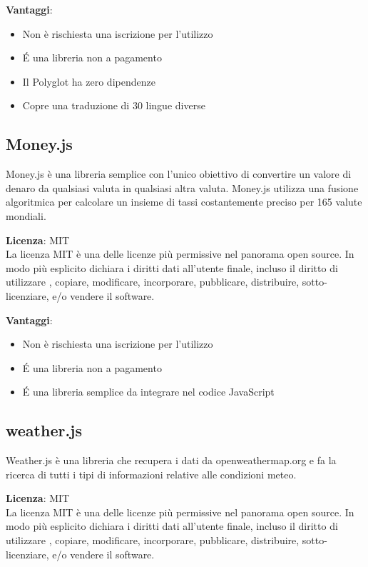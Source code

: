 \textbf{Vantaggi}: 
\begin{itemize}
	\item Non è rischiesta una iscrizione per l'utilizzo
	\item \'E una libreria non a pagamento
	\item Il Polyglot ha zero dipendenze
	\item Copre una traduzione di 30 lingue diverse
\end{itemize}




\subsection{Money.js}

Money.js è una libreria semplice con l'unico obiettivo di convertire un valore di denaro da qualsiasi valuta in qualsiasi altra valuta. Money.js utilizza una fusione algoritmica per calcolare un insieme di tassi costantemente preciso per 165 valute mondiali. 

\textbf{Licenza}: MIT \\
La licenza MIT è una delle licenze più permissive nel panorama open source. In modo più esplicito dichiara i diritti dati all'utente finale, incluso il diritto di utilizzare , copiare, modificare, incorporare, pubblicare, distribuire, sotto-licenziare, e/o vendere il software.

\textbf{Vantaggi}: 
\begin{itemize}
	\item Non è rischiesta una iscrizione per l'utilizzo
	\item \'E una libreria non a pagamento
	\item \'E una libreria semplice da integrare nel codice JavaScript
\end{itemize}


\subsection{weather.js}

Weather.js è una libreria che recupera i dati da openweathermap.org e fa la ricerca di tutti i tipi di informazioni relative alle condizioni meteo.

\textbf{Licenza}: MIT \\
La licenza MIT è una delle licenze più permissive nel panorama open source. In modo più esplicito dichiara i diritti dati all'utente finale, incluso il diritto di utilizzare , copiare, modificare, incorporare, pubblicare, distribuire, sotto-licenziare, e/o vendere il software.

